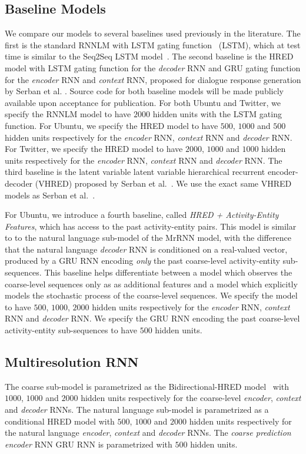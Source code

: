 \documentclass{article}
\begin{document}
\subsection{Baseline Models}
We compare our models to several baselines used previously in the literature.
The first is the standard RNNLM with LSTM gating function~\cite{mikolov2010recurrent} (LSTM),
which at test time is similar to the Seq2Seq LSTM model~\cite{sutskever2014sequence}.
The second baseline is the HRED model with LSTM gating function for the \textit{decoder} RNN and GRU gating function for the \textit{encoder} RNN and \textit{context} RNN,
proposed for dialogue response generation by Serban et al.\@\cite{DBLP:conf/aaai/SerbanSBCP16} \cite{sordoni2015ahier}.
Source code for both baseline models will be made publicly available upon acceptance for publication.
For both Ubuntu and Twitter, we specify the RNNLM model to have $2000$ hidden units with the LSTM gating function.
For Ubuntu, we specify the HRED model to have $500$, $1000$ and $500$ hidden units respectively for the \textit{encoder} RNN, \textit{context} RNN and \textit{decoder} RNN.
For Twitter, we specify the HRED model to have $2000$, $1000$ and $1000$ hidden units respectively for the \textit{encoder} RNN, \textit{context} RNN and \textit{decoder} RNN.
The third baseline is the latent variable latent variable hierarchical recurrent encoder-decoder (VHRED) proposed by Serban et al.~\cite{serban2016hierarchical}.
We use the exact same VHRED models as Serban et al.~\cite{serban2016hierarchical}.


For Ubuntu, we introduce a fourth baseline, called \textit{HRED + Activity-Entity Features}, which has access to the past activity-entity pairs.
This model is similar to to the natural language sub-model of the MrRNN model, with the difference that the natural language \textit{decoder} RNN is conditioned on a real-valued vector, produced by a GRU RNN encoding \textit{only} the past coarse-level activity-entity sub-sequences.
This baseline helps differentiate between a model which observes the coarse-level sequences only as as additional features and a model which explicitly models the stochastic process of the coarse-level sequences. 
We specify the model to have $500$, $1000$, $2000$ hidden units respectively for the \textit{encoder} RNN, \textit{context} RNN and \textit{decoder} RNN. We specify the GRU RNN encoding the past coarse-level activity-entity sub-sequences to have $500$ hidden units.


\subsection{Multiresolution RNN}
The coarse sub-model is parametrized as the Bidirectional-HRED model~\cite{DBLP:conf/aaai/SerbanSBCP16} with $1000$, $1000$ and $2000$ hidden units respectively for the coarse-level \textit{encoder}, \textit{context} and \textit{decoder} RNNs.
The natural language sub-model is parametrized as a conditional HRED model with $500$, $1000$ and $2000$ hidden units respectively for the natural language \textit{encoder}, \textit{context} and \textit{decoder} RNNs. 
The \textit{coarse prediction encoder} RNN GRU RNN is parametrized with $500$ hidden units.
\end{document}
